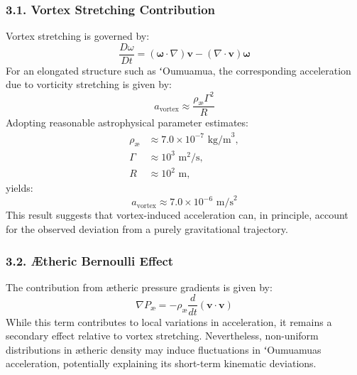     \subsubsection*{3.1. Vortex Stretching Contribution}
    Vortex stretching is governed by:
    \begin{equation*}
        \frac{D\omega}{Dt} = (\mathbf{\omega} \cdot \nabla) \mathbf{v} - (\nabla \cdot \mathbf{v}) \mathbf{\omega}
    \end{equation*}
    For an elongated structure such as ʻOumuamua, the corresponding acceleration due to vorticity stretching is given by:
    \begin{equation*}
        a_\text{vortex} \approx \frac{\rho_\text{\ae} \Gamma^2}{R}
    \end{equation*}
    Adopting reasonable astrophysical parameter estimates:
    \begin{align*}
        \rho_\text{\ae} &\approx 7.0 \times 10^{-7} \text{ kg/m}^3,\\
        \Gamma &\approx 10^3 \text{ m}^2/\text{s},\\
        R &\approx 10^2 \text{ m},
    \end{align*}
    yields:
    \begin{equation*}
        a_\text{vortex} \approx 7.0 \times 10^{-6} \text{ m/s}^2
    \end{equation*}
    This result suggests that vortex-induced acceleration can, in principle, account for the observed deviation from a purely gravitational trajectory.

    \subsubsection*{3.2. Ætheric Bernoulli Effect}
    The contribution from ætheric pressure gradients is given by:
    \begin{equation*}
        \nabla P_\text{\ae} = -\rho_\text{\ae} \frac{d}{dt} (\mathbf{v} \cdot \mathbf{v})
    \end{equation*}
    While this term contributes to local variations in acceleration, it remains a secondary effect relative to vortex stretching. Nevertheless, non-uniform distributions in ætheric density may induce fluctuations in ʻOumuamua\rqs s acceleration, potentially explaining its short-term kinematic deviations.

